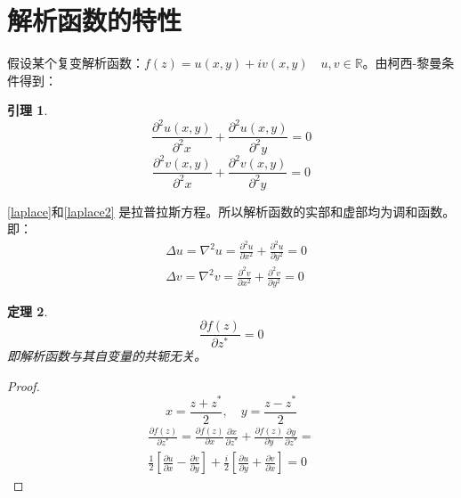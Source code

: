 \documentclass[10pt, a4paper, oneside]{ctexbook}
\newtheorem{theorem}{定理}[section]
\newtheorem{lemma}[theorem]{引理}
\begin{document}
\section{解析函数的特性}
假设某个复变解析函数：$f(z)=u(x,y)+iv(x,y)\quad u,v\in \mathbb{R}$。由柯西-黎曼条件得到：
\begin{lemma}
    \begin{equation}
        \label{laplace}
        \frac{\displaystyle \partial^2 u(x,y)}{ \displaystyle \partial^2 x}+\frac{\displaystyle \partial^2 u(x,y)}{\displaystyle \partial^2 y}=0
    \end{equation}
    \begin{equation}
        \label{laplace2}
        \frac{\displaystyle \partial^2 v(x,y)}{ \displaystyle \partial^2 x}+\frac{\displaystyle \partial^2 v(x,y)}{\displaystyle \partial^2 y}=0
    \end{equation}
\end{lemma}
\ref{laplace}和\ref{laplace2} 是拉普拉斯方程。所以解析函数的实部和虚部均为调和函数。即：
\begin{equation*}
    \begin{aligned}
         & \Delta u=\nabla^{2} u=\frac{\partial^{2} u}{\partial x^{2}}+\frac{\partial^{2} u}{\partial y^{2}}=0 \\
         & \Delta v=\nabla^{2} v=\frac{\partial^{2} v}{\partial x^{2}}+\frac{\partial^{2} v}{\partial y^{2}}=0
    \end{aligned}
\end{equation*}
\begin{theorem}
    $$\frac{\displaystyle \partial f(z)}{ \displaystyle \partial z^*}=0$$
    即解析函数与其自变量的共轭无关。
\end{theorem}
\begin{proof}
    $$x=\frac{z+z^*}{2},\quad y=\frac{z-z^*}{2}$$
    \begin{align*}
        \frac{\displaystyle \partial f(z)}{ \displaystyle \partial z^*}=\frac{\displaystyle \partial f(z)}{ \displaystyle \partial x}\frac{\displaystyle \partial x}{ \displaystyle \partial z^*}+\frac{\displaystyle \partial f(z)}{ \displaystyle \partial y}\frac{\displaystyle \partial y}{ \displaystyle \partial z^*}= \\
        \frac{1}{2}\left[\frac{\displaystyle \partial u}{ \displaystyle \partial x}-\frac{\displaystyle \partial v}{ \displaystyle \partial y}\right]+\frac{i}{2}\left[ \frac{\displaystyle \partial u}{ \displaystyle \partial y}+\frac{\displaystyle \partial v}{ \displaystyle \partial x} \right]=0
    \end{align*}
\end{proof}
\end{document}
